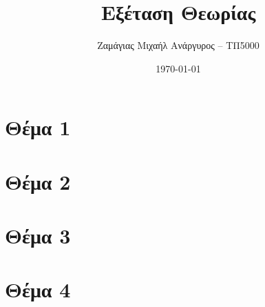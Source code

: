 \documentclass[12pt]{turabian-researchpaper}
\title{Εξέταση Θεωρίας}
\author{Ζαμάγιας Μιχαήλ Ανάργυρος -- ΤΠ5000}
\date{\today}
\begin{document}
\begin{titlepage}
    \maketitle
\end{titlepage}

\tableofcontents

\newpage

\section{Θέμα 1}

\section{Θέμα 2}

\section{Θέμα 3}

\section{Θέμα 4}
\end{document}
